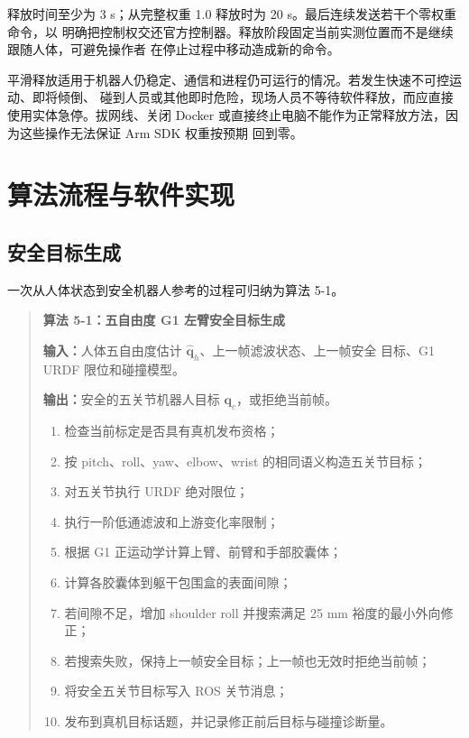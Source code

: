 释放时间至少为 3 s；从完整权重 1.0 释放时为 20 s。最后连续发送若干个零权重命令，以
明确把控制权交还官方控制器。释放阶段固定当前实测位置而不是继续跟随人体，可避免操作者
在停止过程中移动造成新的命令。

平滑释放适用于机器人仍稳定、通信和进程仍可运行的情况。若发生快速不可控运动、即将倾倒、
碰到人员或其他即时危险，现场人员不等待软件释放，而应直接使用实体急停。拔网线、关闭
Docker 或直接终止电脑不能作为正常释放方法，因为这些操作无法保证 Arm SDK 权重按预期
回到零。

\section{算法流程与软件实现}
\label{sec:ch5_algorithms_implementation}

\subsection{安全目标生成}
\label{subsec:ch5_safe_target_algorithm}

一次从人体状态到安全机器人参考的过程可归纳为算法 5-1。

\begin{quote}
\textbf{算法 5-1：五自由度 G1 左臂安全目标生成}

\textbf{输入：}人体五自由度估计 $\hat{\boldsymbol q}_h$、上一帧滤波状态、上一帧安全
目标、G1 URDF 限位和碰撞模型。

\textbf{输出：}安全的五关节机器人目标 $\boldsymbol q_c$，或拒绝当前帧。

\begin{enumerate}[label=\arabic*.]
  \item 检查当前标定是否具有真机发布资格；
  \item 按 pitch、roll、yaw、elbow、wrist 的相同语义构造五关节目标；
  \item 对五关节执行 URDF 绝对限位；
  \item 执行一阶低通滤波和上游变化率限制；
  \item 根据 G1 正运动学计算上臂、前臂和手部胶囊体；
  \item 计算各胶囊体到躯干包围盒的表面间隙；
  \item 若间隙不足，增加 shoulder roll 并搜索满足 25 mm 裕度的最小外向修正；
  \item 若搜索失败，保持上一帧安全目标；上一帧也无效时拒绝当前帧；
  \item 将安全五关节目标写入 ROS 关节消息；
  \item 发布到真机目标话题，并记录修正前后目标与碰撞诊断量。
\end{enumerate}
\end{quote}


